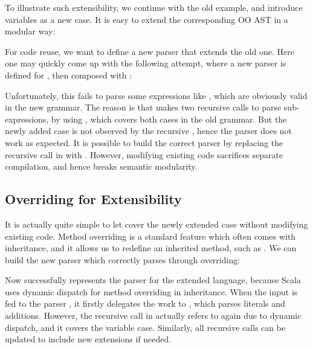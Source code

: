To illustrate such extensibility, we continue with the old
example, and introduce variables as a new case.
It is easy to extend the corresponding OO AST in a modular way:


For code reuse, we want to define a new parser that extends
the old one. Here one may quickly come up
with the following attempt, where a new parser is defined for , then composed
with :


Unfortunately, this fails to parse some expressions like , which are obviously valid in the new grammar.
The reason is that  makes two recursive calls to parse sub-expressions, by using , which
covers both cases in the old grammar. But the newly added case  is not observed by the recursive ,
hence the parser does not work as expected. It is possible to build the correct parser by replacing the recursive call in  with .
However, modifying existing code sacrifices separate compilation, and hence breaks semantic modularity.

\subsection{Overriding for Extensibility}\label{subsec:overriding}

It is actually quite simple to let  cover the newly
extended case without modifying existing code. Method overriding is a
standard feature which often comes with inheritance, and it allows us
to redefine an inherited method, such as . We can
build the new parser which correctly parses 
through overriding:


Now  successfully represents the parser for the extended language, because Scala uses dynamic dispatch for
method overriding in inheritance. When the input  is fed to the parser , it firstly delegates
the work to , which parses literals and additions. However, the recursive call  in 
actually refers to  again due to dynamic dispatch, and it covers the variable case. Similarly, all recursive calls can be updated to include new extensions if needed.

